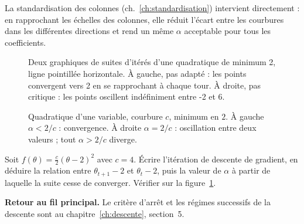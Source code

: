 La standardisation des colonnes (ch.~\ref{ch:standardisation}) intervient
directement : en rapprochant les échelles des colonnes, elle réduit l'écart entre
les courbures dans les différentes directions et rend un même $\alpha$ acceptable
pour tous les coefficients.

\begin{figure}[htbp]
\centering
\begin{graphique}{Deux graphiques de suites d'itérés d'une quadratique de minimum 2, ligne pointillée horizontale. À gauche, pas adapté : les points convergent vers 2 en se rapprochant à chaque tour. À droite, pas critique : les points oscillent indéfiniment entre -2 et 6.}
\begin{minipage}[t]{.48\textwidth}
\centering
{}
\end{minipage}\hfill
\begin{minipage}[t]{.48\textwidth}
\centering
{}
\end{minipage}
\end{graphique}
\caption{Quadratique d'une variable, courbure $c$, minimum en $2$. À gauche
$\alpha<2/c$ : convergence. À droite $\alpha=2/c$ : oscillation entre deux
valeurs ; tout $\alpha>2/c$ diverge.}
\label{fig:ann-opt-alpha-quadratique}
\end{figure}
\FloatBarrier

\begin{exercice}
Soit $f(\theta)=\tfrac{c}{2}(\theta-2)^2$ avec $c=4$. Écrire l'itération de
descente de gradient, en déduire la relation entre $\theta_{t+1}-2$ et
$\theta_t-2$, puis la valeur de $\alpha$ à partir de laquelle la suite cesse de
converger. Vérifier sur la
figure~\ref{fig:ann-opt-alpha-quadratique}.
\end{exercice}

\textbf{Retour au fil principal.} Le critère d'arrêt et les régimes successifs de
la descente sont au chapitre~\ref{ch:descente}, section~5.
